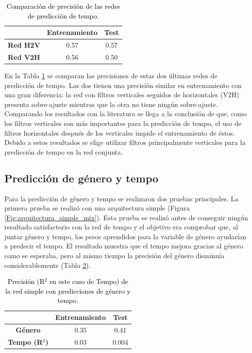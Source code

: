 \begin{table}[h]
\centering
\begin{tabular}{ccc}
\textbf{}                 & \textbf{Entrenamiento} & \textbf{Test} \\ \hline
\textbf{Red H2V} & 0.57                   & 0.57          \\
\textbf{Red V2H} & 0.56                   & 0.50          \\ \hline
\end{tabular}
\caption{\textcolor{black}{Comparación de precisión de las redes de predicción de tempo.}}
\label{tab:precision_tempo}
\end{table}

En la Tabla \ref{tab:precision_tempo} se comparan las precisiones de estas dos últimas redes de predicción de tempo. Las dos tienen una precisión similar en entrenamiento con una gran diferencia: la red con filtros verticales seguidos de horizontales (V2H) presenta sobre-ajuste mientras que la otra no tiene ningún sobre-ajuste. Comparando los resultados con la literatura se llega a la conclusión de que, como los filtros verticales son más importantes para la predicción de tempo, el uso de filtros horizontales después de los verticales impide el entrenamiento de éstos. Debido a estos resultados se elige utilizar filtros principalmente verticales para la predicción de tempo en la red conjunta.

\subsection{Predicción de género y tempo}\label{sec:resultados_mix}

\noindent Para la predicción de género y tempo se realizaron dos pruebas principales. La primera prueba se realizó con una arquitectura simple (Figura \ref{Fig:arquitectura_simple_mix}). Esta prueba se realizó antes de conseguir ningún resultado satisfactorio con la red de tempo y el objetivo era comprobar que, al juntar género y tempo, los pesos aprendidos para la variable de género ayudarían a predecir el tempo. El resultado muestra que el tempo mejora gracias al género como se esperaba, pero al mismo tiempo la precisión del género disminuía considerablemente (Tabla \ref{tab:precision_mix_simple}). 

\begin{table}[htb]
\centering
\begin{tabular}{ccc}
\textbf{}       & \textbf{Entrenamiento} & \textbf{Test} \\ \hline
\textbf{Género} & 0.35                   & 0.41          \\
\textbf{Tempo (R$^2$)}  & 0.03                   & 0.004         \\ \hline
\end{tabular}
\caption{\textcolor{black}{Precisión (R$^2$ en este caso de Tempo) de la red simple con predicciones de género y tempo.}}
\label{tab:precision_mix_simple}
\end{table}


